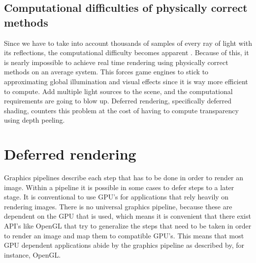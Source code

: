 \documentclass{ACGSeminar}
\begin{document}
	\subsection{Computational difficulties of physically correct methods}
	Since we have to take into account thousands of samples of every ray of light with its reflections, the computational difficulty becomes apparent \cite{DST}. Because of this, it is nearly impossible to achieve real time rendering using physically correct methods on an average system. This forces game engines to stick to approximating global illumination and visual effects since it is way more efficient to compute. Add multiple light sources to the scene, and the computational requirements are going to blow up. Deferred rendering, specifically deferred shading, counters this problem at the cost of having to compute transparency using depth peeling.

\section{Deferred rendering}
	Graphics pipelines describe each step that has to be done in order to render an image. Within a pipeline it is possible in some cases to defer steps to a later stage. It is conventional to use GPU's for applications that rely heavily on rendering images. There is no universal graphics pipeline, because these are dependent on the GPU that is used, which means it is convenient that there exist API's like OpenGL that try to generalize the steps that need to be taken in order to render an image and map them to compatible GPU's. This means that most GPU dependent applications abide by the graphics pipeline as described by, for instance, OpenGL.
\end{document}
